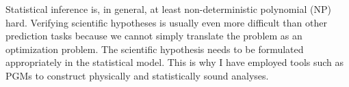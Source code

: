 
Statistical inference is, in general, at least non-deterministic polynomial (NP) 
hard. Verifying scientific hypotheses is usually even more difficult than other
prediction tasks because we cannot simply translate the problem as an 
optimization problem. The scientific hypothesis needs to be formulated 
appropriately in the statistical model. 
This is why I have employed tools such as PGMs to construct physically and 
statistically sound analyses. 

